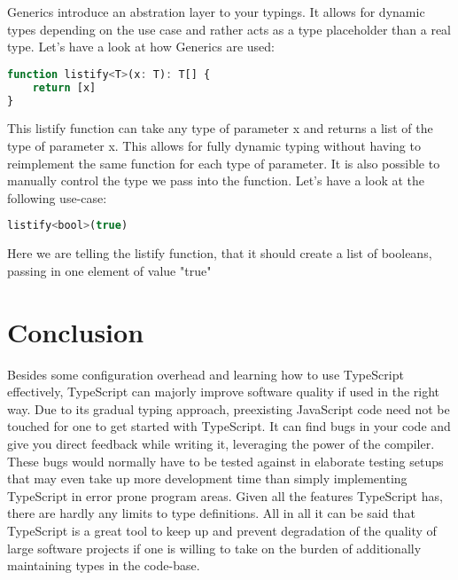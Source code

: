 \documentclass[english,runningheads, letterpaper]{llncs}[2018/03/10]
\begin{document}
Generics introduce an abstration layer to your typings. It allows
for dynamic types depending on the use case and rather acts as a type placeholder than a real type. Let's have a look at
how Generics are used:

\begin{lstlisting}[style=ES6, language=JavaScript, caption="Generic definition"]
function listify<T>(x: T): T[] {
	return [x]
}
\end{lstlisting}

This listify function can take any type of parameter x and returns a list of the type of parameter x. This allows for fully dynamic typing without having to reimplement the same function for each type of parameter. It is also possible to manually control the type we pass into the function. Let's have a look at the following use-case:

\begin{lstlisting}[style=ES6, language=JavaScript, caption="Generic usage"]
listify<bool>(true)
\end{lstlisting}

Here we are telling the listify function, that it should create a list of booleans, passing in one element of value "true"


\section{Conclusion}

Besides some configuration overhead and learning how to use TypeScript effectively, TypeScript can majorly improve software quality if used in the right way. Due to its gradual typing approach, preexisting JavaScript code need not be touched for one to get started with TypeScript. It can find bugs in your code and give you direct feedback while writing it, leveraging the power of the compiler. These bugs would normally have to be tested against in elaborate testing setups that may even take up more development time than simply implementing TypeScript in error prone program areas. Given all the features TypeScript has, there are hardly any limits to type definitions. All in all it can be said that TypeScript is a great tool to keep up and prevent degradation of the quality of large software projects if one is willing to take on the burden of additionally maintaining types in the code-base.  

\pagebreak
\end{document}
